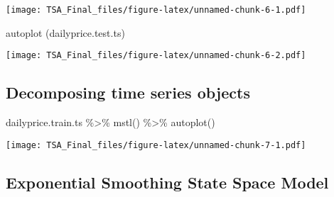 \documentclass[
]{article}
\newenvironment{Shaded}{\begin{snugshade}}{\end{snugshade}}
\newcommand{\CommentTok}[1]{\textcolor[rgb]{0.56,0.35,0.01}{\textit{#1}}}
\newcommand{\FunctionTok}[1]{\textcolor[rgb]{0.00,0.00,0.00}{#1}}
\newcommand{\NormalTok}[1]{#1}
\newcommand{\SpecialCharTok}[1]{\textcolor[rgb]{0.00,0.00,0.00}{#1}}
\begin{document}
\texttt{[image: TSA\_Final\_files/figure-latex/unnamed-chunk-6-1.pdf]}

\begin{Shaded}
\begin{Highlighting}[]
\FunctionTok{autoplot}\NormalTok{ (dailyprice.test.ts)}
\end{Highlighting}
\end{Shaded}

\texttt{[image: TSA\_Final\_files/figure-latex/unnamed-chunk-6-2.pdf]}

\begin{Shaded}
\end{Shaded}

\hypertarget{decomposing-time-series-objects}{%
\subsection{Decomposing time series
objects}\label{decomposing-time-series-objects}}

\begin{Shaded}
\begin{Highlighting}[]
\NormalTok{dailyprice.train.ts }\SpecialCharTok{\%\textgreater{}\%} \FunctionTok{mstl}\NormalTok{() }\SpecialCharTok{\%\textgreater{}\%} \FunctionTok{autoplot}\NormalTok{()}
\end{Highlighting}
\end{Shaded}

\texttt{[image: TSA\_Final\_files/figure-latex/unnamed-chunk-7-1.pdf]}

\hypertarget{exponential-smoothing-state-space-model}{%
\subsection{Exponential Smoothing State Space
Model}\label{exponential-smoothing-state-space-model}}
\end{document}
